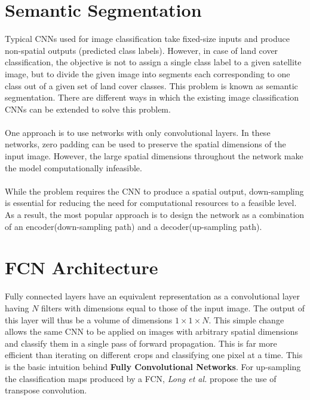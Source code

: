\documentclass[12pt, a4paper]{report}
\begin{document}
\section{Semantic Segmentation}
Typical CNNs used for image classification take fixed-size inputs and produce non-spatial outputs (predicted class labels). However, in case of land cover classification, the objective is not to assign a single class label to a given satellite image, but to divide the given image into segments each corresponding to one class out of a given set of land cover classes. This problem is known as semantic segmentation. There are different ways in which the existing image classification CNNs can be extended to solve this problem.
\paragraph{}
One approach is to use networks with only convolutional layers. In these networks, zero padding can be used to preserve the spatial dimensions of the input image. However, the large spatial dimensions throughout the network make the model computationally infeasible. \cite{long2015fully, cs231n, unet}
\paragraph{}
While the problem requires the CNN to produce a spatial output, down-sampling is essential for reducing the need for computational resources to a feasible level. As a result, the most popular approach is to design the network as a combination of an encoder(down-sampling path) and a decoder(up-sampling path).\\

\section{FCN Architecture}
Fully connected layers have an equivalent representation as a convolutional layer having $N$ filters with dimensions equal to those of the input image. The output of this layer will thus be a volume of dimensions $1 \times 1 \times N$. This simple change allows the same CNN to be applied on images with arbitrary spatial dimensions and classify them in a single pass of forward propagation. This is far more efficient than iterating on different crops and classifying one pixel at a time. This is the basic intuition behind \textbf{Fully Convolutional Networks}.\cite{long2015fully} For up-sampling the classification maps produced by a FCN, \textit{Long et al.}\cite{long2015fully} propose the use of transpose convolution. 
\end{document}
